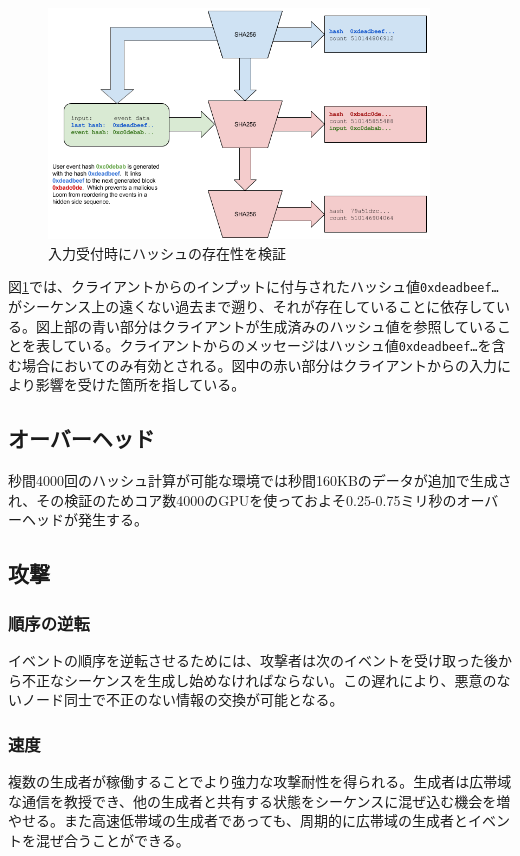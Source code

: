 \documentclass[12pt]{ltjsarticle}
\begin{document}
\begin{figure}
  \begin{center}
    \centering
    \includegraphics[width=0.9\textwidth]{figures/fig_6.png}
    \caption[Fig 6]{入力受付時にハッシュの存在性を検証\label{fig:poh_consistency}}
  \end{center}
  \end{figure}

図\ref{fig:poh_consistency}では、クライアントからのインプットに付与されたハッシュ値\texttt{0xdeadbeef\ldots}がシーケンス上の遠くない過去まで遡り、それが存在していることに依存している。図上部の青い部分はクライアントが生成済みのハッシュ値を参照していることを表している。クライアントからのメッセージはハッシュ値\texttt{0xdeadbeef\ldots}を含む場合においてのみ有効とされる。図中の赤い部分はクライアントからの入力により影響を受けた箇所を指している。

\subsection{オーバーヘッド}
秒間4000回のハッシュ計算が可能な環境では秒間160KBのデータが追加で生成され、その検証のためコア数4000のGPUを使っておよそ0.25-0.75ミリ秒のオーバーヘッドが発生する。

\subsection{攻撃}
\subsubsection{順序の逆転}
 イベントの順序を逆転させるためには、攻撃者は次のイベントを受け取った後から不正なシーケンスを生成し始めなければならない。この遅れにより、悪意のないノード同士で不正のない情報の交換が可能となる。

\subsubsection{速度}
複数の生成者が稼働することでより強力な攻撃耐性を得られる。生成者は広帯域な通信を教授でき、他の生成者と共有する状態をシーケンスに混ぜ込む機会を増やせる。また高速低帯域の生成者であっても、周期的に広帯域の生成者とイベントを混ぜ合うことができる。
\end{document}
